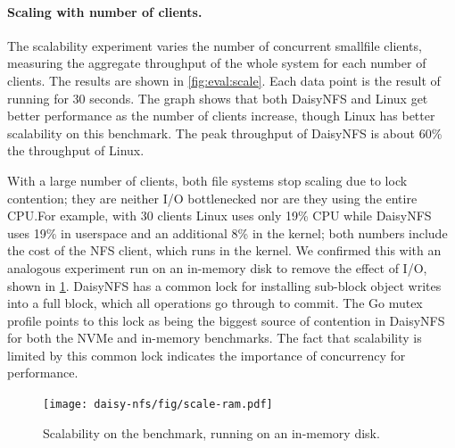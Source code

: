 
\paragraph{Scaling with number of clients.}

The scalability experiment varies the number of concurrent smallfile clients,
measuring the aggregate throughput of the whole system for each number of
clients. The results are shown in \cref{fig:eval:scale}. Each data point is the
result of running for 30 seconds. The graph shows that both DaisyNFS and Linux
get better performance as the number of clients increase, though Linux has
better scalability on this benchmark. The peak throughput of DaisyNFS is about
60\% the throughput of Linux.

With a large number of clients, both file systems
stop scaling due to lock contention; they are neither I/O bottlenecked nor are
they using the entire CPU.\@ For example, with 30 clients Linux uses only 19\% CPU
while DaisyNFS uses 19\% in userspace and an additional 8\% in the kernel; both
numbers include the cost of the NFS client, which runs in the kernel. We
confirmed this with an analogous experiment run on an in-memory disk to remove
the effect of I/O, shown in \cref{fig:eval:scale:ram}. DaisyNFS has a common
lock for installing sub-block object writes into a full block, which all
operations go through to commit. The Go mutex profile points to this lock as
being the biggest source of contention in DaisyNFS for both the NVMe and
in-memory benchmarks. The fact that scalability is limited by this common lock indicates the importance of concurrency for performance.

\begin{figure}[ht]
  \centering
  \texttt{[image: daisy-nfs/fig/scale-ram.pdf]}
  \vspace{0.5\baselineskip}
  \caption[Concurrent smallfile performance on in-memory disk]%
  {Scalability on the  benchmark, running on an in-memory disk.}
  \label{fig:eval:scale:ram}
\end{figure}


